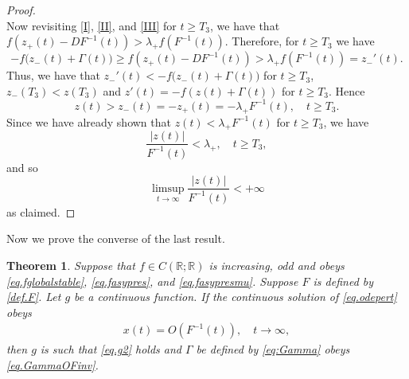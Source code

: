 \documentclass[a4paper,10pt,reqno]{amsart}
\numberwithin{equation}{section}
\newtheorem{theorem}{Theorem}
\theoremstyle{definition}
\theoremstyle{remark}
\DeclareMathOperator{\1}{\mathbbm 1}
\begin{document}
\begin{proof}
\[		\]
		Now revisiting \eqref{I}, \eqref{II}, and \eqref{III} for $t\geq T_3$, we have that $f(z_+(t)-DF^{-1}(t))>\lambda_+f(F^{-1}(t))$.
		Therefore, for $t\geq T_3$ we have 
		\[
		- f\big(z_{-}(t) + \Gamma(t)\big)\geq f(z_+(t)-DF^{-1}(t))>\lambda_+f(F^{-1}(t))=z_-'(t).
		\]
		Thus, we have that $z_-'(t)<	- f\big(z_{-}(t) + \Gamma(t)\big)$ for $t\geq T_3$, $z_-(T_3)<z(T_3)$ and  $z'(t)=	- f(z(t) + \Gamma(t))$ for $t\geq T_3$. 
		Hence
		\[
		z(t) > z_{-}(t) = - z_{+}(t) = - \lambda_{+} F^{-1}(t), 
		\quad t \geq T_{3}.
		\]
		Since we have already shown that $z(t) < \lambda_{+} F^{-1}(t)$ for $t \geq T_{3}$, we have 
		\[
		\frac{|z(t)|}{F^{-1}(t)} < \lambda_{+}, 
		\quad  t \geq T_{3},
		\]	
		and so 
		\[
		\limsup_{t \to \infty} \frac{|z(t)|}{F^{-1}(t)} <  +\infty
		\]
		as claimed.
	\end{proof}
	Now we prove the converse of the last result.
	\begin{theorem} \label{thm.bigOconverse}
		Suppose that $f\in C(\mathbb{R};\mathbb{R})$ is increasing, odd and obeys \eqref{eq.fglobalstable}, \eqref{eq.fasypres}, and \eqref{eq.fasypresmu}. Suppose $F$ is defined by \eqref{def.F}.  Let $g$ be a continuous function. If the continuous solution of \eqref{eq.odepert}  obeys 
		\begin{align*}
			x(t)=O(F^{-1}(t)), \quad t\to\infty,
		\end{align*}	
		then $g$ is such that \eqref{eq.g2} holds and $\Gamma$ be defined by \eqref{eq:Gamma} obeys \eqref{eq.GammaOFinv}.  
	\end{theorem}	
\end{document}
